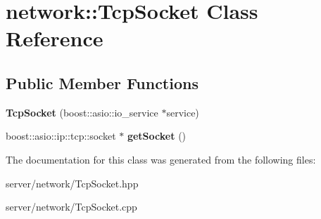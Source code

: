 \hypertarget{classnetwork_1_1_tcp_socket}{\section{network\-:\-:Tcp\-Socket Class Reference}
\label{classnetwork_1_1_tcp_socket}
}
\subsection*{Public Member Functions}
\begin{DoxyCompactItemize}
\item 
\hypertarget{classnetwork_1_1_tcp_socket_a7aba660d438762fad9afc63cfa859882}{{\bfseries Tcp\-Socket} (boost\-::asio\-::io\-\_\-service $\ast$service)}\label{classnetwork_1_1_tcp_socket_a7aba660d438762fad9afc63cfa859882}

\item 
\hypertarget{classnetwork_1_1_tcp_socket_ab534ba10bdfc1bc40e25aeda0a27404f}{boost\-::asio\-::ip\-::tcp\-::socket $\ast$ {\bfseries get\-Socket} ()}\label{classnetwork_1_1_tcp_socket_ab534ba10bdfc1bc40e25aeda0a27404f}

\end{DoxyCompactItemize}


The documentation for this class was generated from the following files\-:\begin{DoxyCompactItemize}
\item 
server/network/Tcp\-Socket.\-hpp\item 
server/network/Tcp\-Socket.\-cpp\end{DoxyCompactItemize}
